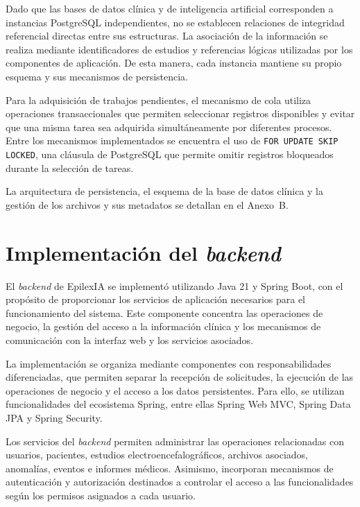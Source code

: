 Dado que las bases de datos clínica y de inteligencia
artificial corresponden a instancias PostgreSQL
independientes, no se establecen relaciones de integridad
referencial directas entre sus estructuras. La asociación
de la información se realiza mediante identificadores
de estudios y referencias lógicas utilizadas por los
componentes de aplicación. De esta manera, cada instancia
mantiene su propio esquema y sus mecanismos de persistencia.

Para la adquisición de trabajos pendientes, el
mecanismo de cola utiliza operaciones transaccionales
que permiten seleccionar registros disponibles y
evitar que una misma tarea sea adquirida
simultáneamente por diferentes procesos. Entre
los mecanismos implementados se encuentra el uso
de \texttt{FOR UPDATE SKIP LOCKED}, una cláusula
de PostgreSQL que permite omitir registros
bloqueados durante la selección de tareas.

\begin{nuevotexto}
La arquitectura de persistencia, el esquema de la base de datos clínica y la gestión de los archivos y sus metadatos se detallan en el Anexo~B.
\end{nuevotexto}

\section{Implementación del \textit{backend}}

El \textit{backend} de EpilexIA se implementó utilizando Java 21
y Spring Boot, con el propósito de proporcionar los
servicios de aplicación necesarios para el funcionamiento
del sistema. Este componente concentra las operaciones
de negocio, la gestión del acceso a la información
clínica y los mecanismos de comunicación con la
interfaz web y los servicios asociados.

La implementación se organiza mediante componentes
con responsabilidades diferenciadas, que permiten
separar la recepción de solicitudes, la ejecución
de las operaciones de negocio y el acceso a los
datos persistentes. Para ello, se utilizan
funcionalidades del ecosistema Spring, entre ellas
Spring Web MVC, Spring Data JPA y Spring Security.

Los servicios del \textit{backend} permiten administrar
las operaciones relacionadas con usuarios,
pacientes, estudios electroencefalográficos,
archivos asociados, anomalías, eventos e informes
médicos. Asimismo, incorporan mecanismos de
autenticación y autorización destinados a
controlar el acceso a las funcionalidades
según los permisos asignados a cada usuario.

